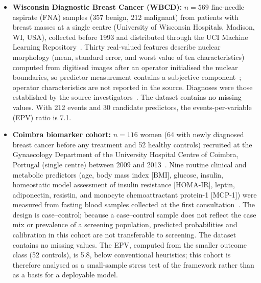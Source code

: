 \documentclass[11pt,a4paper]{article}
\begin{document}
\begin{itemize}
\item \textbf{Wisconsin Diagnostic Breast Cancer (WBCD):} $n=569$ fine-needle aspirate (FNA) samples (357 benign, 212 malignant) from patients with breast masses at a single centre (University of Wisconsin Hospitals, Madison, WI, USA), collected before 1993 and distributed through the UCI Machine Learning Repository~\cite{street1993,uci}. Thirty real-valued features describe nuclear morphology (mean, standard error, and worst value of ten characteristics) computed from digitised images after an operator initialised the nuclear boundaries, so predictor measurement contains a subjective component~\cite{street1993}; operator characteristics are not reported in the source. Diagnoses were those established by the source investigators~\cite{street1993}. The dataset contains no missing values. With 212 events and 30 candidate predictors, the events-per-variable (EPV) ratio is 7.1.
\item \textbf{Coimbra biomarker cohort:} $n=116$ women (64 with newly diagnosed breast cancer before any treatment and 52 healthy controls) recruited at the Gynaecology Department of the University Hospital Centre of Coimbra, Portugal (single centre) between 2009 and 2013~\cite{patricio2018}. Nine routine clinical and metabolic predictors (age, body mass index [BMI], glucose, insulin, homeostatic model assessment of insulin resistance [HOMA-IR], leptin, adiponectin, resistin, and monocyte chemoattractant protein-1 [MCP-1]) were measured from fasting blood samples collected at the first consultation~\cite{patricio2018,uci}. The design is case--control; because a case--control sample does not reflect the case mix or prevalence of a screening population, predicted probabilities and calibration in this cohort are not transferable to screening. The dataset contains no missing values. The EPV, computed from the smaller outcome class (52 controls), is 5.8, below conventional heuristics; this cohort is therefore analysed as a small-sample stress test of the framework rather than as a basis for a deployable model.

\end{itemize}
\end{document}
